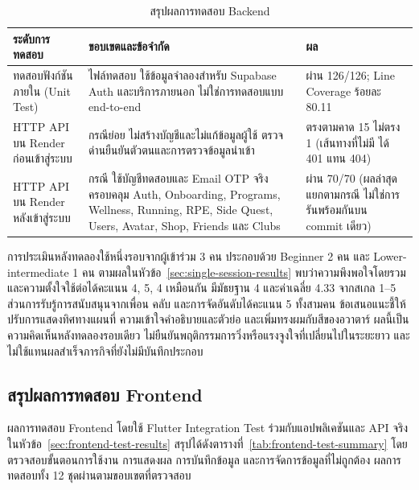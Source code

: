 \begin{table}[H]
\centering
\caption{สรุปผลการทดสอบ Backend}
\label{tab:test_summary}
\small
\begin{tabular}{|>{\raggedright\arraybackslash}p{4.0cm}|>{\raggedright\arraybackslash}p{6.2cm}|>{\raggedright\arraybackslash}p{3.1cm}|}
\hline
\textbf{ระดับการทดสอบ} & \textbf{ขอบเขตและข้อจำกัด} & \textbf{ผล} \\ \hline
ทดสอบฟังก์ชันภายใน (Unit Test) & 15 ไฟล์ทดสอบ ใช้ข้อมูลจำลองสำหรับ Supabase Auth และบริการภายนอก ไม่ใช่การทดสอบแบบ end-to-end & ผ่าน 126/126; Line Coverage ร้อยละ 80.11 \\ \hline
HTTP API บน Render ก่อนเข้าสู่ระบบ & 16 กรณีย่อย ไม่สร้างบัญชีและไม่แก้ข้อมูลผู้ใช้ ตรวจด่านยืนยันตัวตนและการตรวจข้อมูลนำเข้า & ตรงตามคาด 15 ไม่ตรง 1 (เส้นทางที่ไม่มี ได้ 401 แทน 404) \\ \hline
HTTP API บน Render หลังเข้าสู่ระบบ & 70 กรณี ใช้บัญชีทดสอบและ Email OTP จริง ครอบคลุม Auth, Onboarding, Programs, Wellness, Running, RPE, Side Quest, Users, Avatar, Shop, Friends และ Clubs & ผ่าน 70/70 (ผลล่าสุดแยกตามกรณี ไม่ใช่การรันพร้อมกันบน commit เดียว) \\ \hline
\end{tabular}
\end{table}

การประเมินหลังทดลองใช้หนึ่งรอบจากผู้เข้าร่วม 3 คน ประกอบด้วย Beginner 2 คน และ Lower-intermediate 1 คน ตามผลในหัวข้อ~\ref{sec:single-session-results} พบว่าความพึงพอใจโดยรวมและความตั้งใจใช้ต่อได้คะแนน 4, 5, 4 เหมือนกัน มีมัธยฐาน 4 และค่าเฉลี่ย 4.33 จากสเกล 1--5 ส่วนการรับรู้การสนับสนุนจากเพื่อน คลับ และการจัดอันดับได้คะแนน 5 ทั้งสามคน ข้อเสนอแนะชี้ให้ปรับการแสดงทิศทางแผนที่ ความเข้าใจคำอธิบายและตัวย่อ และเพิ่มทรงผมกับสีของอวาตาร์ ผลนี้เป็นความคิดเห็นหลังทดลองรอบเดียว ไม่ยืนยันพฤติกรรมการวิ่งหรือแรงจูงใจที่เปลี่ยนไปในระยะยาว และไม่ใช้แทนผลสำเร็จภารกิจที่ยังไม่มีบันทึกประกอบ

\subsection{สรุปผลการทดสอบ Frontend}
\label{sec:frontend-test-summary}

ผลการทดสอบ Frontend โดยใช้ Flutter Integration Test ร่วมกับแอปพลิเคชันและ API จริง ในหัวข้อ~\ref{sec:frontend-test-results} สรุปได้ดังตารางที่~\ref{tab:frontend-test-summary} โดยตรวจสอบขั้นตอนการใช้งาน การแสดงผล การบันทึกข้อมูล และการจัดการข้อมูลที่ไม่ถูกต้อง ผลการทดสอบทั้ง 12 ชุดผ่านตามขอบเขตที่ตรวจสอบ

